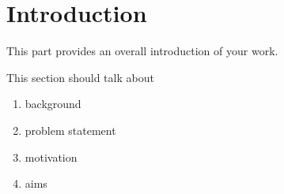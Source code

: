 \section{Introduction}
\label{ch:intro}
This part provides an overall introduction of your work.

This section should talk about
\begin{enumerate}
	\item background
	\item problem statement
	\item motivation
	\item aims
\end{enumerate}